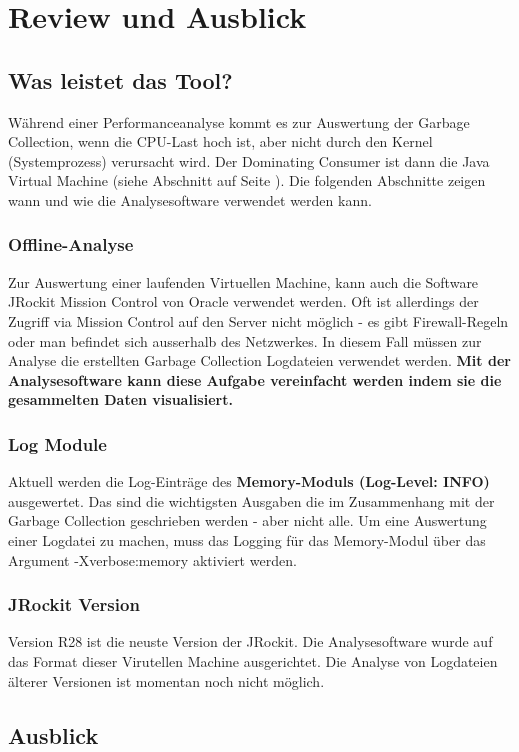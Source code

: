\chapter{Review und Ausblick}\label{review}
\section{Was leistet das Tool?}
Während einer Performanceanalyse kommt es zur Auswertung der Garbage Collection, wenn die CPU-Last hoch ist, aber nicht durch den Kernel (Systemprozess) verursacht wird. Der Dominating Consumer ist dann die Java Virtual Machine (siehe Abschnitt  auf Seite \pageref{dominating_consumer}). Die folgenden Abschnitte zeigen wann und wie die Analysesoftware verwendet werden kann.

\subsection{Offline-Analyse}
Zur Auswertung einer laufenden Virtuellen Machine, kann auch die Software JRockit Mission Control von Oracle verwendet werden. Oft ist allerdings der Zugriff via Mission Control auf den Server nicht möglich - es gibt Firewall-Regeln oder man befindet sich ausserhalb des Netzwerkes. In diesem Fall müssen zur Analyse die erstellten Garbage Collection Logdateien verwendet werden. \textbf{Mit der Analysesoftware kann diese Aufgabe vereinfacht werden indem sie die gesammelten Daten visualisiert.}

\subsection{Log Module}
Aktuell werden die Log-Einträge des \textbf{Memory-Moduls  (Log-Level: INFO)} ausgewertet. Das sind die wichtigsten Ausgaben die im Zusammenhang mit der Garbage Collection geschrieben werden - aber nicht alle. Um eine Auswertung einer Logdatei zu machen, muss das Logging für das Memory-Modul über das Argument -Xverbose:memory aktiviert werden.

\subsection{JRockit Version}
Version R28 ist die neuste Version der JRockit. Die Analysesoftware wurde auf das Format dieser Virutellen Machine ausgerichtet. Die Analyse von Logdateien älterer Versionen ist momentan noch nicht möglich.

\section{Ausblick}
